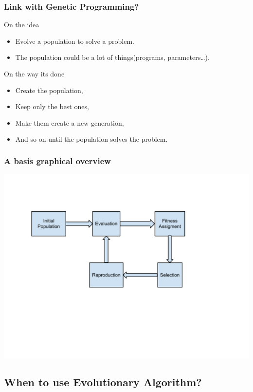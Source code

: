 \begin{frame}
  \frametitle{Link with Genetic Programming?}
  \begin{block}{On the idea}
    \begin{itemize}
    \item Evolve a population to solve a problem.
    \item The population could be a lot of things(programs, parameters\dots).
    \end{itemize}
  \end{block}

  \begin{block}{On the way its done}
    \begin{itemize}
    \item Create the population,
    \item Keep only the best ones,
    \item Make them create a new generation,
    \item And so on until the population solves the problem.
    \end{itemize}
  \end{block}
\end{frame}

\begin{frame}
  \frametitle{A basis graphical overview}
  \begin{center}
    \includegraphics[scale=0.5]{img/cycle}
  \end{center}
\end{frame}

\subsection{When to use Evolutionary Algorithm?}


